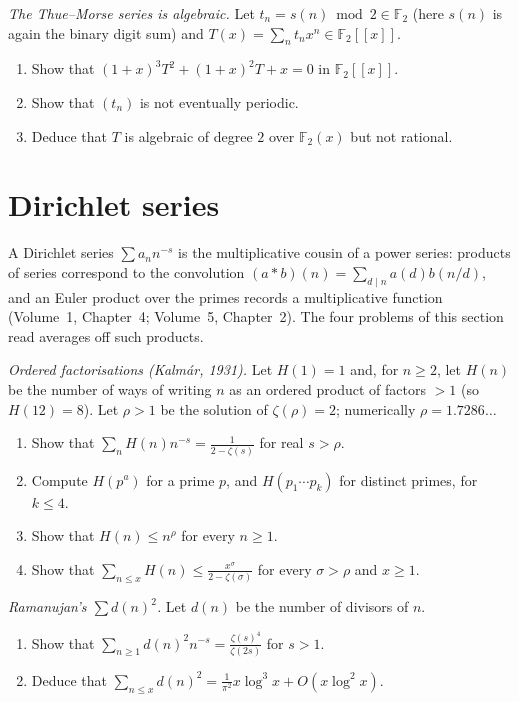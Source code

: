 \begin{exercise}[$\star\star$]\label{pb:thuemorse}
\emph{The Thue--Morse series is algebraic.} Let $t_n=s(n)\bmod2\in\mathbb F_2$ (here $s(n)$ is again the binary digit sum) and
$T(x)=\sum_nt_nx^n\in\mathbb F_2[[x]]$.
\begin{enumerate}[label=(\alph*)]
\item Show that $(1+x)^3T^2+(1+x)^2T+x=0$ in $\mathbb F_2[[x]]$.
\item Show that $(t_n)$ is not eventually periodic.
\item Deduce that $T$ is algebraic of degree $2$ over $\mathbb F_2(x)$ but not rational.
\end{enumerate}
\end{exercise}

\section{Dirichlet series}

A Dirichlet series $\sum a_nn^{-s}$ is the multiplicative cousin of a power series: products of series correspond to the
convolution $(a*b)(n)=\sum_{d\mid n}a(d)b(n/d)$, and an Euler product over the primes records a multiplicative function
(Volume~1, Chapter~4; Volume~5, Chapter~2). The four problems of this section read averages off such products.

\begin{exercise}[$\star\star$]\label{pb:orderedfact}
\emph{Ordered factorisations (Kalmár, 1931).} Let $H(1)=1$ and, for $n\ge2$, let $H(n)$ be the number of ways of writing $n$ as an
ordered product of factors $>1$ (so $H(12)=8$). Let $\rho>1$ be the solution of $\zeta(\rho)=2$; numerically $\rho=1.7286\ldots$
\begin{enumerate}[label=(\alph*)]
\item Show that $\sum_nH(n)n^{-s}=\frac1{2-\zeta(s)}$ for real $s>\rho$.
\item Compute $H(p^a)$ for a prime $p$, and $H(p_1\cdots p_k)$ for distinct primes, for $k\le4$.
\item Show that $H(n)\le n^\rho$ for every $n\ge1$.
\item Show that $\sum_{n\le x}H(n)\le\frac{x^\sigma}{2-\zeta(\sigma)}$ for every $\sigma>\rho$ and $x\ge1$.
\end{enumerate}
\end{exercise}

\begin{exercise}[$\star\star$]\label{pb:dsquared}
\emph{Ramanujan's $\sum d(n)^2$.} Let $d(n)$ be the number of divisors of $n$.
\begin{enumerate}[label=(\alph*)]
\item Show that $\sum_{n\ge1}d(n)^2n^{-s}=\frac{\zeta(s)^4}{\zeta(2s)}$ for $s>1$.
\item Deduce that $\sum_{n\le x}d(n)^2=\frac1{\pi^2}x\log^3x+O(x\log^2x)$.
\end{enumerate}
\end{exercise}

